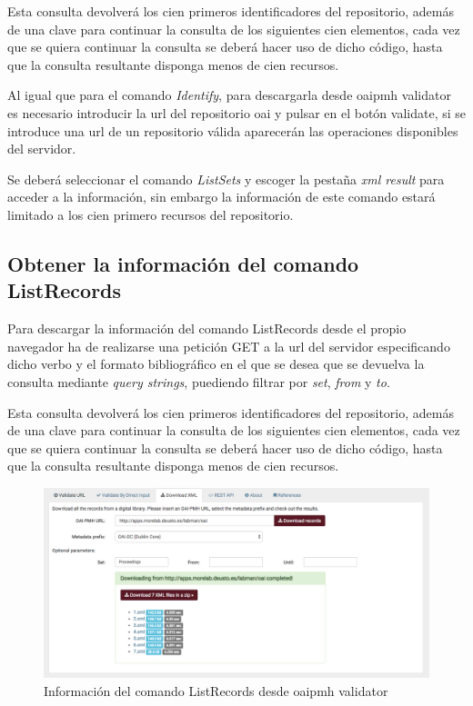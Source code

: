 Esta consulta devolverá los cien primeros identificadores del repositorio, además de una clave para continuar la consulta de los siguientes cien elementos, cada vez que se quiera continuar la consulta se deberá hacer uso de dicho código, hasta que la consulta resultante disponga menos de cien recursos. 

Al igual que para el comando \textit{Identify}, para descargarla desde \acrshort{oaipmh} validator es necesario introducir la \acrshort{url} del repositorio \acrshort{oai} y pulsar en el botón validate, si se introduce una \acrshort{url} de un repositorio válida aparecerán las operaciones disponibles del servidor.

Se deberá seleccionar el comando \textit{ListSets} y escoger la pestaña \textit{\acrshort{xml} result} para acceder a la información, sin embargo la información de este comando estará limitado a los cien primero recursos del repositorio.

\subsection{Obtener la información del comando ListRecords}

Para descargar la información del comando ListRecords desde el propio navegador ha de realizarse una petición GET a la \acrshort{url} del servidor especificando dicho verbo y el formato bibliográfico en el que se desea que se devuelva la consulta mediante \textit{query strings}, puediendo filtrar por \textit{set}, \textit{from} y \textit{to}.

Esta consulta devolverá los cien primeros identificadores del repositorio, además de una clave para continuar la consulta de los siguientes cien elementos, cada vez que se quiera continuar la consulta se deberá hacer uso de dicho código, hasta que la consulta resultante disponga menos de cien recursos.

\begin{figure}[!htbp]
	\centering
	\includegraphics[scale=0.31]{fig/download_oai/download_listrecords}
	\caption{Información del comando ListRecords desde \acrshort{oaipmh} validator}
	\label{fig:download_listrecords}
\end{figure}

